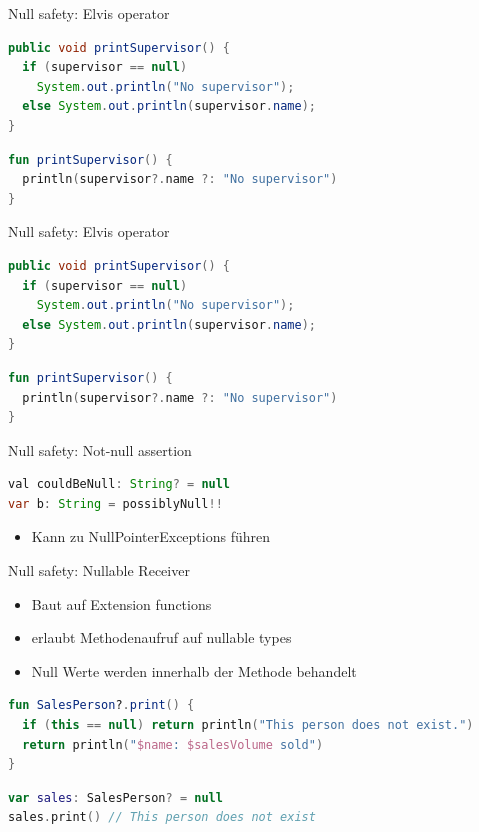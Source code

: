 \documentclass{beamer}
\begin{document}
\begin{frame}[fragile]{Null safety: Elvis operator}
  \begin{lstlisting}[language=Java]
public void printSupervisor() {
  if (supervisor == null)
    System.out.println("No supervisor");
  else System.out.println(supervisor.name);
}   
  \end{lstlisting}
  \begin{lstlisting}[language=Kotlin]
fun printSupervisor() {
  println(supervisor?.name ?: "No supervisor")
}
  \end{lstlisting}
\end{frame}

\begin{frame}[fragile]{Null safety: Elvis operator}
  \begin{lstlisting}[language=Java]
public void printSupervisor() {
  if (supervisor == null)
    System.out.println("No supervisor");
  else System.out.println(supervisor.name);
}
  \end{lstlisting}
  \begin{lstlisting}[language=Kotlin]
fun printSupervisor() {
  println(supervisor?.name ?: "No supervisor")
}
  \end{lstlisting}
\end{frame}

\begin{frame}[fragile]{Null safety: Not-null assertion}
  \begin{lstlisting}[language=Java]
val couldBeNull: String? = null
var b: String = possiblyNull!!
  \end{lstlisting}
  \begin{itemize}
    \item Kann zu NullPointerExceptions führen
  \end{itemize}
\end{frame}

\begin{frame}[fragile]{Null safety: Nullable Receiver}
  \begin{itemize}
    \item Baut auf Extension functions
    \item erlaubt Methodenaufruf auf nullable types
    \item Null Werte werden innerhalb der Methode behandelt
  \end{itemize}
  \begin{lstlisting}[language=Kotlin]
fun SalesPerson?.print() {
  if (this == null) return println("This person does not exist.")
  return println("$name: $salesVolume sold")
}
  \end{lstlisting}
  \begin{lstlisting}[language=Kotlin]
var sales: SalesPerson? = null
sales.print() // This person does not exist
  \end{lstlisting}
\end{frame}

\end{document}
